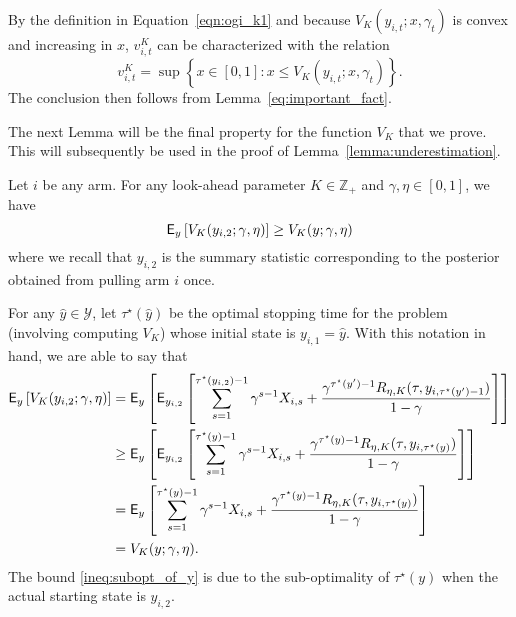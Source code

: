 \begin{myproof}[Proof.]
	By the definition in Equation~\eqref{eqn:ogi_k1} and because $V_K(y_{i,t}; x, \gamma_t)$ is convex and increasing in $x$, $v^K_{i,t}$  can be characterized with the relation 
	\begin{equation*}%
	v^K_{i,t} = \sup\left\{ x \in [0,1] : x \le V_K(y_{i,t}; x, \gamma_t)  \right\}.
	\end{equation*}
	The conclusion then follows from Lemma~\ref{eq:important_fact}.
\end{myproof}
The next Lemma will be the final property for the function $V_K$ that we prove. This will subsequently be used in the proof of Lemma~\ref{lemma:underestimation}.
\begin{lemma} \label{lemma:vk_bound}
	Let $i$ be any arm. For any look-ahead parameter $K \in \mathbb{Z}_+$ and $\gamma, \eta \in [0,1]$, we have
	\begin{equation*}
		\mathsf{E}_y\left[V_K(y_{i,2}; \gamma, \eta) \right] \ge V_K(y; \gamma, \eta)
	\end{equation*}
	where we recall that $y_{i,2}$ is the summary statistic corresponding to the posterior obtained from pulling arm $i$ once.
\end{lemma}
\begin{myproof}[Proof.]
	For any $\hat y \in \mathcal{Y}$, let $\tau^\star(\hat y)$ be the optimal stopping time for the problem (involving computing $V_K$) whose initial state is $y_{i,1} = \hat y$. With this notation in hand, we are able to say that
	\begin{align}
		\mathsf{E}_y \left[V_K(y_{i,2}; \gamma, \eta) \right] & = \mathsf{E}_y\left[\mathsf{E}_{y_{i,2}}\left[\sum_{s=1}^{\tau^\star(y_{i,2})-1} \gamma^{s-1} X_{i,s} + \frac{\gamma^{\tau^\star(y')-1} R_{\eta, K}(\tau, y_{i,\tau^\star(y')-1})}{1-\gamma} \right]\right]\nonumber \\
		& \ge  \mathsf{E}_y\left[\mathsf{E}_{y_{i,2}}\left[\sum_{s=1}^{\tau^\star(y)-1} \gamma^{s-1} X_{i,s} + \frac{\gamma^{\tau^\star(y)-1} R_{\eta, K}(\tau, y_{i,\tau^\star(y)})}{1-\gamma}\right] \right] \label{ineq:subopt_of_y}\\
		& = \mathsf{E}_y\left[\sum_{s=1}^{\tau^\star(y)-1} \gamma^{s-1} X_{i,s} + \frac{\gamma^{\tau^\star(y)-1} R_{\eta, K}(\tau, y_{i,\tau^\star(y)})}{1-\gamma}\right] \nonumber \\
		& = V_K(y; \gamma, \eta). \nonumber
	\end{align}
	The bound \eqref{ineq:subopt_of_y} is due to the sub-optimality of $\tau^\star(y)$ when the actual starting state is $y_{i,2}$.
\end{myproof}
